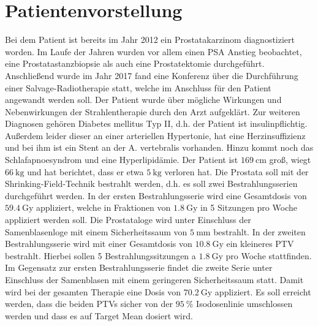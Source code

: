 \section{Patientenvorstellung}
\label{sec:Patientenvorstellung}
Bei dem Patient ist bereits im Jahr 2012 ein Prostatakarzinom diagnostiziert worden. Im Laufe der Jahren wurden vor allem einen PSA Anstieg beobachtet, eine Prostatastanzbiopsie als auch eine Prostatektomie durchgeführt. Anschließend wurde im Jahr 2017 fand eine Konferenz über die Durchführung einer Salvage-Radiotherapie statt, welche im Anschluss für den Patient angewandt werden soll. Der Patient wurde über mögliche Wirkungen und Nebenwirkungen der Strahlentherapie durch den Arzt aufgeklärt. Zur weiteren Diagnosen gehören Diabetes mellitus Typ II, d.h. der Patient ist insulinpflichtig. Außerdem leider dieser an einer arteriellen Hypertonie, hat eine Herzinsuffizienz und bei ihm ist ein Stent an der A. vertebralis vorhanden. Hinzu kommt noch das Schlafapnoesyndrom und eine Hyperlipidämie. Der Patient ist $\SI{169}{\centi\meter}$ groß, wiegt $\SI{66}{\kilogram}$ und hat berichtet, dass er etwa $\SI{5}{\kilogram}$ verloren hat. Die Prostata soll mit der Shrinking-Field-Technik bestrahlt werden, d.h. es soll zwei Bestrahlungsserien durchgeführt werden. In der ersten Bestrahlungsserie wird eine Gesamtdosis von $\SI{59,4}{\gray}$ appliziert, welche in Fraktionen von $\SI{1,8}{\gray}$ in 5 Sitzungen pro Woche appliziert werden soll. Die Prostataloge wird unter Einschluss der Samenblasenloge mit einem Sicherheitssaum von $\SI{5}{\milli\meter}$ bestrahlt. In der zweiten Bestrahlungsserie wird mit einer Gesamtdosis von $\SI{10,8}{\gray}$ ein kleineres PTV bestrahlt. Hierbei sollen 5 Bestrahlungssitzungen a $\SI{1,8}{\gray}$ pro Woche stattfinden. Im Gegensatz zur ersten Bestrahlungsserie findet die zweite Serie unter Einschluss der Samenblasen mit einem geringeren Sicherheitssaum statt. Damit wird bei der gesamten Therapie eine Dosis von $\SI{70,2}{\gray}$ appliziert. Es soll erreicht werden, dass die beiden PTVs sicher von der $\SI{95}{\percent}$ Isodosenlinie umschlossen werden und dass es auf Target Mean dosiert wird.